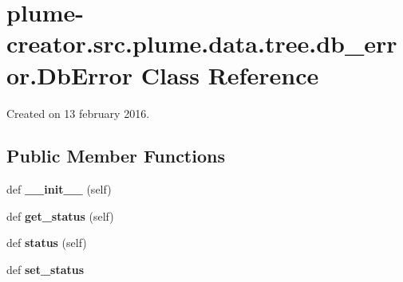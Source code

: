 \hypertarget{classplume-creator_1_1src_1_1plume_1_1data_1_1tree_1_1db__error_1_1_db_error}{}\section{plume-\/creator.src.\+plume.\+data.\+tree.\+db\+\_\+error.\+Db\+Error Class Reference}
\label{classplume-creator_1_1src_1_1plume_1_1data_1_1tree_1_1db__error_1_1_db_error}


Created on 13 february 2016.  


\subsection*{Public Member Functions}
\begin{DoxyCompactItemize}
\item 
def {\bfseries \+\_\+\+\_\+init\+\_\+\+\_\+} (self)\hypertarget{classplume-creator_1_1src_1_1plume_1_1data_1_1tree_1_1db__error_1_1_db_error_a838523ed511271049b81595ac59a9dc8}{}\label{classplume-creator_1_1src_1_1plume_1_1data_1_1tree_1_1db__error_1_1_db_error_a838523ed511271049b81595ac59a9dc8}

\item 
def {\bfseries get\+\_\+status} (self)\hypertarget{classplume-creator_1_1src_1_1plume_1_1data_1_1tree_1_1db__error_1_1_db_error_a2d9478593299b3ae8ae9d0fa84126155}{}\label{classplume-creator_1_1src_1_1plume_1_1data_1_1tree_1_1db__error_1_1_db_error_a2d9478593299b3ae8ae9d0fa84126155}

\item 
def {\bfseries status} (self)\hypertarget{classplume-creator_1_1src_1_1plume_1_1data_1_1tree_1_1db__error_1_1_db_error_ab9a1eef3b507b232a097e85b133f0986}{}\label{classplume-creator_1_1src_1_1plume_1_1data_1_1tree_1_1db__error_1_1_db_error_ab9a1eef3b507b232a097e85b133f0986}

\item 
def {\bfseries set\+\_\+status}\hypertarget{classplume-creator_1_1src_1_1plume_1_1data_1_1tree_1_1db__error_1_1_db_error_a14a7d295945cd9a7aebc5aa5cf35e265}{}\label{classplume-creator_1_1src_1_1plume_1_1data_1_1tree_1_1db__error_1_1_db_error_a14a7d295945cd9a7aebc5aa5cf35e265}

\end{DoxyCompactItemize}
